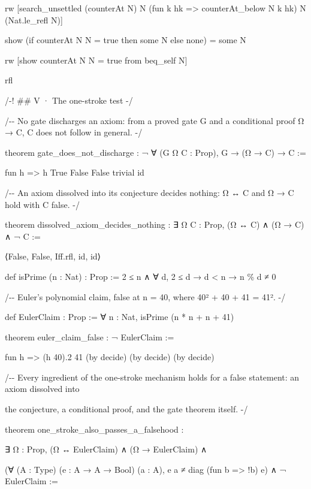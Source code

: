 \documentclass[10pt,twocolumn]{article}
\newenvironment{Shaded}{}{}
\newcommand{\NormalTok}[1]{#1}
\providecommand{\NormalTok}[1]{#1}
\providecommand{\textquotesingle}{'}
\providecommand{\NormalTok}[1]{#1}
\begin{document}
\begin{strip}
\begin{Shaded}
\begin{Highlighting}[]
\NormalTok{  rw [search\_unsettled (counterAt N) N (fun k hk =\textgreater{} counterAt\_below N k hk) N (Nat.le\_refl N)]}

\NormalTok{  show (if counterAt N N = true then some N else none) = some N}

\NormalTok{  rw [show counterAt N N = true from beq\_self N]}

\NormalTok{  rfl}

\NormalTok{/{-}! \#\# V · The one{-}stroke test {-}/}

\NormalTok{/{-}{-} No gate discharges an axiom: from a proved gate G and a conditional proof Ω → C, C does not follow in general. {-}/}

\NormalTok{theorem gate\_does\_not\_discharge : ¬ ∀ (G Ω C : Prop), G → (Ω → C) → C :=}

\NormalTok{  fun h =\textgreater{} h True False False trivial id}

\NormalTok{/{-}{-} An axiom dissolved into its conjecture decides nothing: Ω ↔ C and Ω → C hold with C false. {-}/}

\NormalTok{theorem dissolved\_axiom\_decides\_nothing : ∃ Ω C : Prop, (Ω ↔ C) ∧ (Ω → C) ∧ ¬ C :=}

\NormalTok{  ⟨False, False, Iff.rfl, id, id⟩}

\NormalTok{def isPrime (n : Nat) : Prop := 2 ≤ n ∧ ∀ d, 2 ≤ d → d \textless{} n → n \% d ≠ 0}

\NormalTok{/{-}{-} Euler\textquotesingle{}s polynomial claim, false at n = 40, where 40² + 40 + 41 = 41². {-}/}

\NormalTok{def EulerClaim : Prop := ∀ n : Nat, isPrime (n * n + n + 41)}

\NormalTok{theorem euler\_claim\_false : ¬ EulerClaim :=}

\NormalTok{  fun h =\textgreater{} (h 40).2 41 (by decide) (by decide) (by decide)}

\NormalTok{/{-}{-} Every ingredient of the one{-}stroke mechanism holds for a false statement: an axiom dissolved into}

\NormalTok{    the conjecture, a conditional proof, and the gate theorem itself. {-}/}

\NormalTok{theorem one\_stroke\_also\_passes\_a\_falsehood :}

\NormalTok{    ∃ Ω : Prop, (Ω ↔ EulerClaim) ∧ (Ω → EulerClaim) ∧}

\NormalTok{      (∀ (A : Type) (e : A → A → Bool) (a : A), e a ≠ diag (fun b =\textgreater{} !b) e) ∧ ¬ EulerClaim :=}


\end{Highlighting}
\end{Shaded}
\end{strip}
\end{document}
